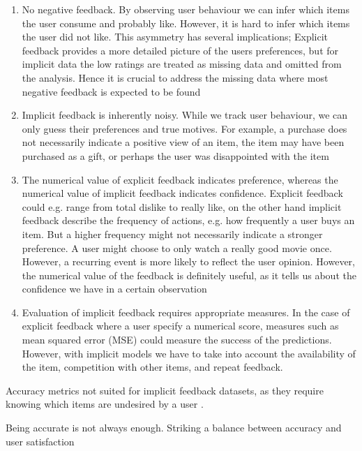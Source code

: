 \begin{enumerate}

\item No negative feedback. By observing user behaviour we can infer which
items the user consume and probably like. However, it is hard to infer which
items the user did not like. This asymmetry has several implications; Explicit
feedback provides a more detailed picture of the
users preferences, but for implicit data the low ratings are treated as missing
data and omitted from the analysis. Hence it is crucial to address the missing
data where most negative feedback is expected to be found

\item Implicit feedback is inherently noisy. While we track user behaviour, we
can only guess their preferences and true motives. For example, a purchase does
not necessarily indicate a positive view of an item, the item may have been
purchased as a gift, or perhaps the user was disappointed
with the item

\item The numerical value of explicit feedback indicates preference, whereas
the numerical value of implicit feedback indicates confidence. Explicit
feedback could e.g. range from total dislike to really like, on the other hand
implicit feedback describe the frequency of actions, e.g. how
frequently a user buys an item. But a higher frequency might not necessarily
indicate a stronger preference. A user might choose to only watch a really good
movie once. However, a recurring event is more likely to reflect the user
opinion. However, the numerical value of the feedback is definitely useful, as
it tells us about the confidence we have in a certain observation

\item Evaluation of implicit feedback requires appropriate measures. In the
case of explicit feedback where a user specify a numerical score, measures such
as mean squared error (MSE) could measure the success of the predictions.
However, with implicit models we have to take into account
the availability of the item, competition with other items, and repeat
feedback.

\end{enumerate}

Accuracy metrics not suited for implicit feedback datasets, as they require
knowing which items are undesired by a user \cite{Hu2008}.

Being accurate is not always enough. Striking a balance between accuracy and
user satisfaction \cite{McNee2006}

